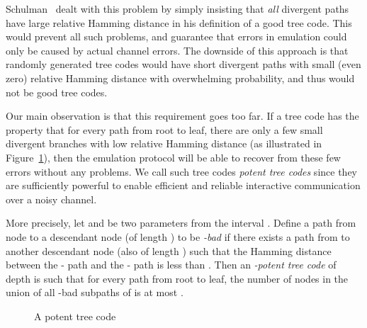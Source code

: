 \documentclass[ letterpaper, 11pt]{article}
\newcommand{\potent}{potent\xspace}
\begin{document}
Schulman~\cite{schulman93} dealt with this problem by simply insisting that \emph{all} divergent paths have large relative Hamming distance in his definition of a good tree code.  This would prevent all such problems, and guarantee that errors in emulation could only be caused by actual channel errors.  The downside of this approach is that randomly generated tree codes would have short divergent paths with small (even zero) relative Hamming distance with overwhelming probability, and thus would not be good tree codes.

Our main observation is that this requirement goes too far.  If a tree code has the property that for every path from root to leaf, there are only a few small divergent branches with low relative Hamming distance (as illustrated in Figure~\ref{fig:potent}), then the emulation protocol will be able to recover from these few errors without any problems.  We call such tree codes \emph{\potent tree codes} since they are sufficiently powerful to enable efficient and reliable interactive communication over a noisy channel.

More precisely, let  and  be two parameters from the interval .
Define a path from node  to a descendant node  (of length
) to be \emph{-bad} if there exists a path from  to
another descendant node  (also of length ) such that the
Hamming distance between the - path and the - path is less
than .
Then an \emph{-potent tree code} of depth  is such that for every path  from root to leaf, the number of nodes in the union of all -bad subpaths of  is at most
.



\begin{figure}[htb]
\begin{center}
\end{center}
\caption{A potent tree code}
\label{fig:potent}
\end{figure}
\end{document}
